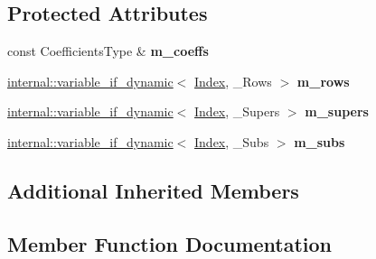 \subsection*{Protected Attributes}
\begin{DoxyCompactItemize}
\item 
\mbox{\label{class_eigen_1_1internal_1_1_band_matrix_wrapper_ad481463a6d56da0723164849763a26bc}} 
const Coefficients\+Type \& {\bfseries m\+\_\+coeffs}
\item 
\mbox{\label{class_eigen_1_1internal_1_1_band_matrix_wrapper_a93d973aec90dcf3f836f3660749aafcc}} 
\mbox{\hyperlink{class_eigen_1_1internal_1_1variable__if__dynamic}{internal\+::variable\+\_\+if\+\_\+dynamic}}$<$ \mbox{\hyperlink{struct_eigen_1_1_eigen_base_a554f30542cc2316add4b1ea0a492ff02}{Index}}, \+\_\+\+Rows $>$ {\bfseries m\+\_\+rows}
\item 
\mbox{\label{class_eigen_1_1internal_1_1_band_matrix_wrapper_a5432c89ed42f81404cf32126adb911d3}} 
\mbox{\hyperlink{class_eigen_1_1internal_1_1variable__if__dynamic}{internal\+::variable\+\_\+if\+\_\+dynamic}}$<$ \mbox{\hyperlink{struct_eigen_1_1_eigen_base_a554f30542cc2316add4b1ea0a492ff02}{Index}}, \+\_\+\+Supers $>$ {\bfseries m\+\_\+supers}
\item 
\mbox{\label{class_eigen_1_1internal_1_1_band_matrix_wrapper_ab3e85f1556236cfe51fd8f026c22bce5}} 
\mbox{\hyperlink{class_eigen_1_1internal_1_1variable__if__dynamic}{internal\+::variable\+\_\+if\+\_\+dynamic}}$<$ \mbox{\hyperlink{struct_eigen_1_1_eigen_base_a554f30542cc2316add4b1ea0a492ff02}{Index}}, \+\_\+\+Subs $>$ {\bfseries m\+\_\+subs}
\end{DoxyCompactItemize}
\subsection*{Additional Inherited Members}


\subsection{Member Function Documentation}
\mbox{\label{class_eigen_1_1internal_1_1_band_matrix_wrapper_a5c81a2138f0adfb23216de383aaeeeab}} 
